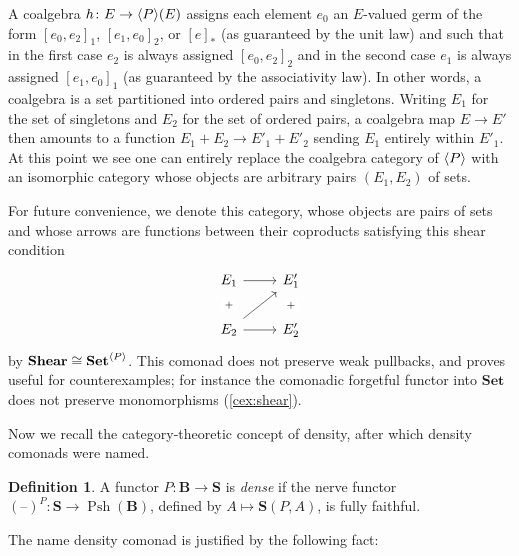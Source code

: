 \documentclass[11pt, oneside, article]{memoir}
\theoremstyle{plain}
\theoremstyle{definition}
\newtheorem{definition}[def]{Definition}
\theoremstyle{remark}
\newenvironment{example}
{\renewcommand\qedsymbol{$\lrcorner$}%
  \pushQED{\qed}\myexample}
{\popQED\endmyexample}
\DeclareMathOperator{\Psh}{Psh}
\DeclarePairedDelimiter{\gen}{\langle}{\rangle}
\newcommand{\dash}{{\mathord{\text{--}}}}
\newcommand{\namedcat}[1]{\mathbf{#1}}
\newcommand{\cat}[1]{\mathbf{#1}}
\newcommand{\Set}{\namedcat{Set}}
\newcommand{\Shear}{\namedcat{Shear}}
\newcommand{\CoalgOn}[2]{{#2}^{#1}}
\newcommand{\CoalgSet}[1]{\CoalgOn{#1}{\Set}}
\newcommand{\nerve}[1]{(\dash)^{#1}}
\newcommand{\ph}[1]{#1}
\newcommand{\Ps}[1]{\Psh(#1)}
\newcommand{\Ho}[1]{#1}
\newcommand{\eE}{E}
\newcommand{\xA}{A}
\newcommand{\hH}{h}
\newcommand{\bB}{\cat{B}}
\newcommand{\bS}{\cat{S}}
\newcommand{\pP}{\ph{P}}
\newcommand{\cP}{\gen{\pP}}
\newcommand{\PSet}{\CoalgSet{\cP}}
\begin{document}
\begin{example}
  A coalgebra $\hH \colon \eE \to \cP(\eE)$ assigns each element $e_0$ an
  $\eE$-valued germ of the form $[e_0, e_2]_1$, $[e_1, e_0]_2$, or
  $[e]_\ast$ (as guaranteed by the unit law) and such that in the
  first case $e_2$ is always assigned $[e_0, e_2]_2$ and in the second
  case $e_1$ is always assigned $[e_1, e_0]_1$ (as guaranteed by the
  associativity law). In other words, a coalgebra is a set partitioned
  into ordered pairs and singletons. Writing $\eE_1$ for the set of
  singletons and $\eE_2$ for the set of ordered pairs, a coalgebra map
  $\eE \to \eE'$ then amounts to a function
  $\eE_1 + \eE_2 \to \eE'_1 + \eE'_2$ sending $\eE_1$ entirely within
  $\eE'_1$. At this point we see one can entirely replace the coalgebra category 
  of $\cP$ with an isomorphic category whose objects 
  are arbitrary pairs $(E_1,E_2)$ of sets.

  For future convenience, we denote this category, whose
  objects are pairs of sets and whose arrows are functions between
  their coproducts satisfying this shear condition
  \[
    \begin{tikzcd}
      {\eE_1} & {\eE'_1} \\
      {\eE_2} & {\eE'_2}
      \arrow[from=1-1, to=1-2]
      \arrow["{+}"{description}, draw=none, from=1-1, to=2-1]
      \arrow["{+}"{description}, draw=none, from=1-2, to=2-2]
      \arrow[from=2-1, to=1-2]
      \arrow[from=2-1, to=2-2]
    \end{tikzcd}
  \]
  by $\Shear \cong \PSet$. This comonad does not preserve weak
  pullbacks, and proves useful for counterexamples; for instance the
  comonadic forgetful functor into $\Set$ does not preserve
  monomorphisms (\cref{cex:shear}).
\end{example}

Now we recall the category-theoretic concept of density, after which
density comonads were named.

\begin{definition}\label{def:dense}
  A functor $\pP \colon \bB \to \bS$ is \emph{dense} if the nerve
  functor $\nerve{\pP} \colon \bS \to \Ps{\bB}$, defined by
  $\xA \mapsto \Ho{\bS}(\pP, \xA)$, is fully faithful.
\end{definition}

The name density comonad is justified by the following fact:
\end{document}
